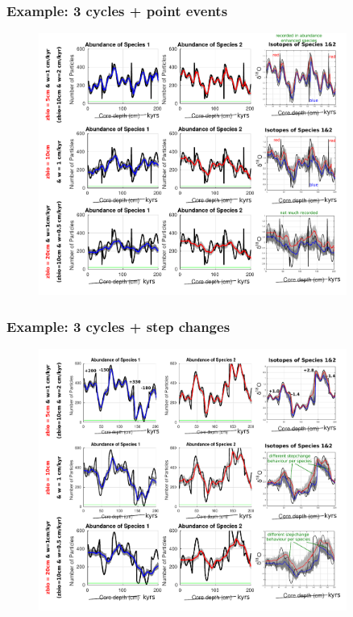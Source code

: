 \documentclass{beamer}
\begin{document}
\begin{frame}
\frametitle{Example: 3 cycles + point events}
\begin{figure}[hbtp]
\hspace*{-0.8cm}\includegraphics[width=0.9\textwidth]{figures/Allcycles_combined_pointevent_5+10+20cm_background.pdf}%
\end{figure}
\end{frame}

\begin{frame}
\frametitle{Example: 3 cycles + step changes}
\begin{figure}[hbtp]
\hspace*{-0.8cm}\includegraphics[width=0.9\textwidth]{figures/Allcycles_combined_stepevent_bigger_5+10+20cm_background.pdf}%
\end{figure}
\end{frame}
\end{document}
